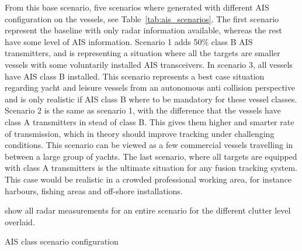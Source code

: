 From this base scenario, five scenarios where generated with different AIS configuration on the vessels, see Table~\ref{tab:ais_scenarios}. The first scenario represent the baseline with only radar information available, whereas the rest have some level of AIS information. Scenario 1 adds 50\% class B AIS transmitters, and is representing a situation where all the targets are smaller vessels with some voluntarily installed AIS transceivers. In scenario 3, all vessels have AIS class B installed. This scenario represents a best case situation regarding yacht and leisure vessels from an autonomous anti collision perspective and is only realistic if AIS class B where to be mandatory for these vessel classes. Scenario 2 is the same as scenario 1, with the difference that the vessels have class A transmitters in stead of class B. This gives them higher and smarter rate of transmission, which in theory should improve tracking under challenging conditions. This scenario can be viewed as a few commercial vessels travelling in between a large group of yachts. The last scenario, where all targets are equipped with class A transmitters is the ultimate situation for any fusion tracking system. This case would be realistic in a crowded professional working area, for instance harbours, fishing areas and off-shore installations.

 show all radar measurements for an entire scenario for the different clutter level overlaid. 
\begin{table}
\centering
{}
\caption{AIS class scenario configuration}\label{tab:ais_scenarios}
\end{table}

